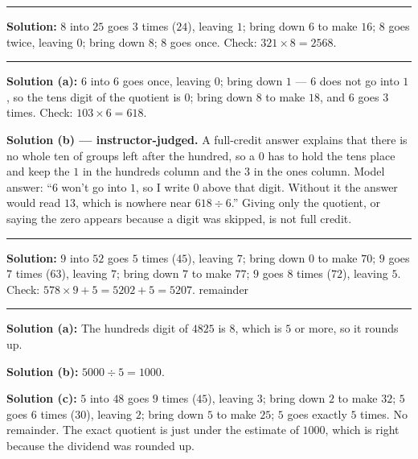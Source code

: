 \documentclass[12pt]{article}
\begin{document}
\vspace{0.12cm}\noindent\rule{\linewidth}{0.2pt}


\textbf{Solution:} $8$ into $25$ goes $3$ times ($24$), leaving $1$; bring down $6$ to make $16$;
$8$ goes twice, leaving $0$; bring down $8$; $8$ goes once. Check:
$321 \times 8 = 2568$. 

\vspace{0.12cm}\noindent\rule{\linewidth}{0.2pt}


\textbf{Solution (a):} $6$ into $6$ goes once, leaving $0$; bring down $1$ --- $6$ does not go into
$1$, so the tens digit of the quotient is $0$; bring down $8$ to make $18$, and $6$ goes $3$ times.
Check: $103 \times 6 = 618$. 

\textbf{Solution (b) --- instructor-judged.} A full-credit answer explains that there is no whole ten of
groups left after the hundred, so a $0$ has to hold the tens place and keep the $1$ in the hundreds
column and the $3$ in the ones column. Model answer: ``$6$ won't go into $1$, so I write $0$ above
that digit. Without it the answer would read $13$, which is nowhere near $618 \div 6$.'' Giving only
the quotient, or saying the zero appears because a digit was skipped, is not full credit.

\vspace{0.12cm}\noindent\rule{\linewidth}{0.2pt}


\textbf{Solution:} $9$ into $52$ goes $5$ times ($45$), leaving $7$; bring down $0$ to make $70$;
$9$ goes $7$ times ($63$), leaving $7$; bring down $7$ to make $77$; $9$ goes $8$ times ($72$),
leaving $5$. Check: $578 \times 9 + 5 = 5202 + 5 = 5207$.  \quad remainder 

\vspace{0.12cm}\noindent\rule{\linewidth}{0.2pt}


\textbf{Solution (a):} The hundreds digit of $4825$ is $8$, which is $5$ or more, so it rounds up.

\textbf{Solution (b):} $5000 \div 5 = 1000$. 

\textbf{Solution (c):} $5$ into $48$ goes $9$ times ($45$), leaving $3$; bring down $2$ to make $32$;
$5$ goes $6$ times ($30$), leaving $2$; bring down $5$ to make $25$; $5$ goes exactly $5$ times.
No remainder. The exact quotient is just under the estimate of $1000$, which is right because the
dividend was rounded up. 
\end{document}
